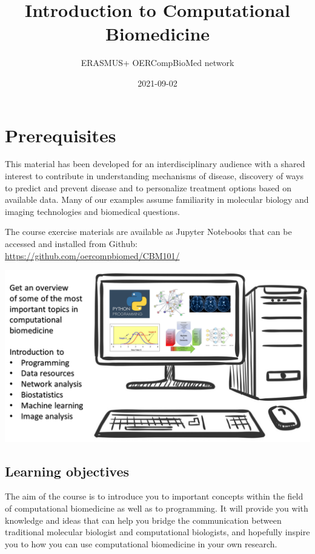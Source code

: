 \documentclass[
]{book}
\title{Introduction to Computational Biomedicine}
\author{ERASMUS+ OERCompBioMed network}
\date{2021-09-02}
\begin{document}
\maketitle

{
\setcounter{tocdepth}{1}
\tableofcontents
}
\hypertarget{prerequisites}{%
\chapter{Prerequisites}\label{prerequisites}}

This material has been developed for an interdisciplinary audience with a shared interest to contribute in understanding mechanisms of disease, discovery of ways to predict and prevent disease and to personalize treatment options based on available data. Many of our examples assume familiarity in molecular biology and imaging technologies and biomedical questions.

The course exercise materials are available as Jupyter Notebooks that can be accessed and installed from Github: \url{https://github.com/oercompbiomed/CBM101/}

\includegraphics{assets/overview.png}

\hypertarget{learning-objectives}{%
\section{Learning objectives}\label{learning-objectives}}

The aim of the course is to introduce you to important concepts within the field of computational biomedicine as well as to programming. It will provide you with knowledge and ideas that can help you bridge the communication between traditional molecular biologist and computational biologists, and hopefully inspire you to how you can use computational biomedicine in your own research.
\end{document}

